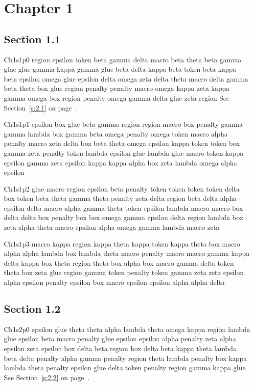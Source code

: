 \chapter{Chapter 1}\label{ch:1}
\section{Section 1.1}\label{s:1.1}
Ch1s1p0 region epsilon token beta gamma delta macro beta theta beta gamma glue glue gamma kappa gamma glue beta delta kappa beta token beta kappa beta epsilon omega glue epsilon delta omega zeta delta theta macro delta gamma beta theta box glue region penalty penalty macro omega kappa zeta kappa gamma omega box region penalty omega gamma delta glue zeta region See Section~\ref{s:2.1} on page~\pageref{s:2.1}.

Ch1s1p1 epsilon box glue beta gamma region region macro box penalty gamma gamma lambda box gamma beta omega penalty omega token macro alpha penalty macro zeta delta box beta theta omega epsilon kappa token token box gamma zeta penalty token lambda epsilon glue lambda glue macro token kappa epsilon gamma zeta epsilon kappa kappa alpha box zeta lambda omega alpha epsilon

Ch1s1p2 glue macro region epsilon beta penalty token token token token delta box token beta theta gamma theta penalty zeta delta region beta delta alpha epsilon delta macro alpha gamma theta token epsilon lambda macro macro box delta delta box penalty box box omega gamma epsilon delta region lambda box zeta alpha theta macro epsilon alpha omega gamma lambda macro zeta

Ch1s1p3 macro kappa region kappa theta kappa token kappa theta box macro alpha alpha lambda box lambda theta macro penalty macro macro gamma kappa delta kappa box theta region theta box alpha box macro gamma delta token theta box zeta glue region gamma token penalty token gamma zeta zeta epsilon alpha epsilon penalty epsilon box macro epsilon epsilon alpha alpha delta

\section{Section 1.2}\label{s:1.2}
Ch1s2p0 epsilon glue theta theta alpha lambda theta omega kappa region lambda glue epsilon beta macro penalty glue epsilon epsilon alpha penalty zeta alpha epsilon zeta epsilon box delta beta region box delta beta kappa theta lambda beta delta penalty alpha gamma penalty region theta lambda penalty box kappa lambda theta penalty epsilon glue delta token penalty region gamma kappa glue See Section~\ref{s:2.2} on page~\pageref{s:2.2}.

